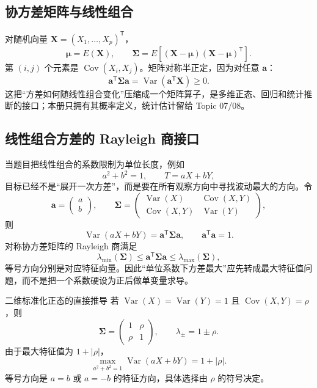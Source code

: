 \documentclass[11pt,a4paper]{ctexart}
\begin{document}
\subsection{协方差矩阵与线性组合}

对随机向量 $\boldsymbol X=(X_1,\ldots,X_p)^{\mathsf T}$，
\[
\boldsymbol\mu=E(\boldsymbol X),\qquad
\boxed{\boldsymbol\Sigma=E[(\boldsymbol X-\boldsymbol\mu)(\boldsymbol X-\boldsymbol\mu)^{\mathsf T}]}.
\]
第 $(i,j)$ 个元素是 $\operatorname{Cov}(X_i,X_j)$。矩阵对称半正定，因为对任意 $\boldsymbol a$：
\[
\boldsymbol a^{\mathsf T}\boldsymbol\Sigma\boldsymbol a
=\operatorname{Var}(\boldsymbol a^{\mathsf T}\boldsymbol X)\geq0.
\]
这把“方差如何随线性组合变化”压缩成一个矩阵算子，是多维正态、回归和统计推断的接口；本册只拥有其概率定义，统计估计留给 Topic 07/08。

\subsection{线性组合方差的 Rayleigh 商接口}

当题目把线性组合的系数限制为单位长度，例如
\[
a^2+b^2=1,\qquad T=aX+bY,
\]
目标已经不是“展开一次方差”，而是要在所有观察方向中寻找波动最大的方向。令
\[
\boldsymbol a=\begin{pmatrix}a\\b\end{pmatrix},\qquad
\boldsymbol\Sigma=\begin{pmatrix}
\operatorname{Var}(X)&\operatorname{Cov}(X,Y)\\
\operatorname{Cov}(X,Y)&\operatorname{Var}(Y)
\end{pmatrix},
\]
则
\[
\operatorname{Var}(aX+bY)=\boldsymbol a^{\mathsf T}\boldsymbol\Sigma\boldsymbol a,
\qquad \boldsymbol a^{\mathsf T}\boldsymbol a=1.
\]
对称协方差矩阵的 Rayleigh 商满足
\[
\lambda_{\min}(\boldsymbol\Sigma)\leq
\boldsymbol a^{\mathsf T}\boldsymbol\Sigma\boldsymbol a\leq
\lambda_{\max}(\boldsymbol\Sigma),
\]
等号方向分别是对应特征向量。因此“单位系数下方差最大”应先转成最大特征值问题，而不是把一个系数硬设为正后做单变量求导。

\begin{methodbox}{二维标准化正态的直接推导}
若 $\operatorname{Var}(X)=\operatorname{Var}(Y)=1$ 且 $\operatorname{Cov}(X,Y)=\rho$，则
\[
\boldsymbol\Sigma=\begin{pmatrix}1&\rho\\\rho&1\end{pmatrix},\qquad
\lambda_{\pm}=1\pm\rho.
\]
由于最大特征值为 $1+|\rho|$，
\[
\max_{a^2+b^2=1}\operatorname{Var}(aX+bY)=1+|\rho|.
\]
等号方向是 $a=b$ 或 $a=-b$ 的特征方向，具体选择由 $\rho$ 的符号决定。
\end{methodbox}
\end{document}
